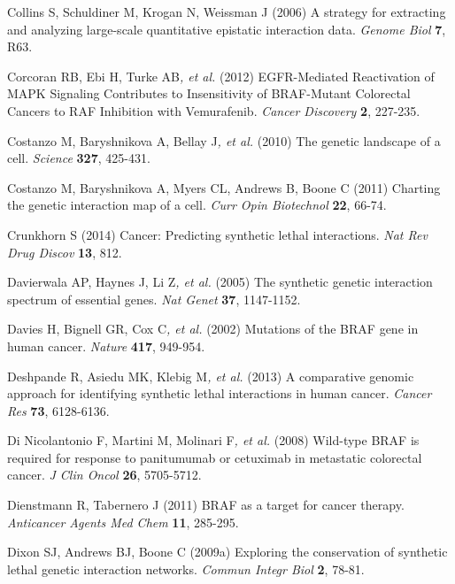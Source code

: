 Collins S, Schuldiner M, Krogan N, Weissman J (2006) A strategy for
extracting and analyzing large-scale quantitative epistatic interaction
data. \textit{Genome Biol} \textbf{7}, R63.



\hypertarget{ENREF24}{}Corcoran RB, Ebi H, Turke AB\textit{, et al.}
(2012) EGFR-Mediated Reactivation of MAPK Signaling Contributes to
Insensitivity of BRAF-Mutant Colorectal Cancers to RAF Inhibition with
Vemurafenib. \textit{Cancer Discovery} \textbf{2}, 227-235.



Costanzo M, Baryshnikova A, Bellay J\textit{, et al.} (2010) The genetic
landscape of a cell. \textit{Science} \textbf{327}, 425-431.



Costanzo M, Baryshnikova A, Myers CL, Andrews B, Boone C (2011) Charting
the genetic interaction map of a cell. \textit{Curr Opin Biotechnol}
\textbf{22}, 66-74.



\hypertarget{ENREF27}{}Crunkhorn S (2014) Cancer: Predicting synthetic
lethal interactions. \textit{Nat Rev Drug Discov} \textbf{13}, 812.



\hypertarget{ENREF28}{}Davierwala AP, Haynes J, Li Z\textit{, et al.}
(2005) The synthetic genetic interaction spectrum of essential genes.
\textit{Nat Genet} \textbf{37}, 1147-1152.



Davies H, Bignell GR, Cox C\textit{, et al.} (2002) Mutations of the
BRAF gene in human cancer. \textit{Nature} \textbf{417}, 949-954.



\hypertarget{ENREF30}{}Deshpande R, Asiedu MK, Klebig M\textit{, et al.}
(2013) A comparative genomic approach for identifying synthetic lethal
interactions in human cancer. \textit{Cancer Res} \textbf{73},
6128-6136.



Di Nicolantonio F, Martini M, Molinari F\textit{, et al.} (2008)
Wild-type BRAF is required for response to panitumumab or cetuximab in
metastatic colorectal cancer. \textit{J Clin Oncol} \textbf{26},
5705-5712.



Dienstmann R, Tabernero J (2011) BRAF as a target for cancer therapy.
\textit{Anticancer Agents Med Chem} \textbf{11}, 285-295.



Dixon SJ, Andrews BJ, Boone C (2009a) Exploring the conservation of
synthetic lethal genetic interaction networks. \textit{Commun Integr
Biol} \textbf{2}, 78-81.



